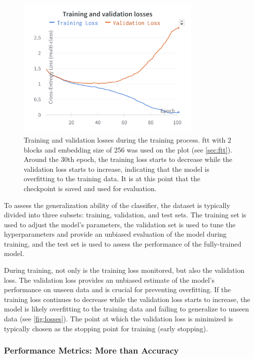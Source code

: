 \begin{figure}[htbp]
    \centering
    \includegraphics[width=0.8\textwidth]{figures/plots/ml/losses.png}
    \caption{Training and validation losses during the training process. \gls{ftt} with 2 blocks and embedding size
        of 256 was used on the plot (see \autoref{sec:ftt}). Around the 30th epoch, the training loss starts to
        decrease while the validation loss starts to increase, indicating that the model is overfitting to
        the training data. It is at this point that the checkpoint is saved and used for evaluation.}
    \label{fig:losses}
\end{figure}

To assess the generalization ability of the classifier, the dataset is typically divided into three subsets: training,
validation, and test sets. The training set is used to adjust the model's parameters, the validation set is used to tune
the hyperparameters and provide an unbiased evaluation of the model during training, and the test set is used to assess
the performance of the fully-trained model.

During training, not only is the training loss monitored, but also the validation loss. The validation loss provides an
unbiased estimate of the model's performance on unseen data and is crucial for preventing overfitting. If the training
loss continues to decrease while the validation loss starts to increase, the model is likely overfitting to the training
data and failing to generalize to unseen data (see \autoref{fig:losses}). The point at which the validation loss is
minimized is typically chosen as the stopping point for training (early stopping).

\subsubsection{Performance Metrics: More than Accuracy}

